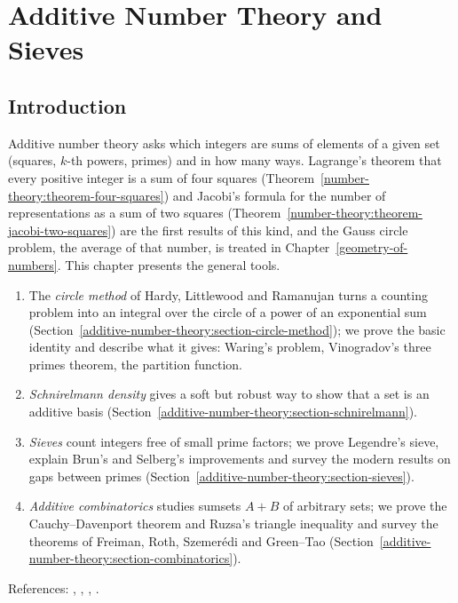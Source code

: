 \chapter{Additive Number Theory and Sieves}\label{additive-number-theory}

\section{Introduction}\label{additive-number-theory:section-introduction}

Additive number theory asks which integers are sums of elements of a given set (squares, $k$-th powers, primes) and in how many ways. Lagrange's theorem that every positive integer is a sum of
four squares (Theorem~\ref{number-theory:theorem-four-squares}) and Jacobi's formula for the number of representations as a sum of two squares (Theorem~\ref{number-theory:theorem-jacobi-two-squares}) are the
first results of this kind, and the Gauss circle problem, the average of that number, is treated in Chapter~\ref{geometry-of-numbers}. This chapter presents the general tools.
\begin{enumerate}
\item The \emph{circle method} of Hardy, Littlewood and Ramanujan turns a counting problem into an integral over the circle of a power of an exponential sum
(Section~\ref{additive-number-theory:section-circle-method}); we prove the basic identity and describe what it gives: Waring's problem, Vinogradov's three primes theorem, the partition function.
\item \emph{Schnirelmann density} gives a soft but robust way to show that a set is an additive basis (Section~\ref{additive-number-theory:section-schnirelmann}).
\item \emph{Sieves} count integers free of small prime factors; we prove Legendre's sieve, explain Brun's and Selberg's improvements and survey the modern results on gaps between primes
(Section~\ref{additive-number-theory:section-sieves}).
\item \emph{Additive combinatorics} studies sumsets $A + B$ of arbitrary sets; we prove the Cauchy--Davenport theorem and Ruzsa's triangle inequality and survey the theorems of Freiman, Roth,
Szemer\'edi and Green--Tao (Section~\ref{additive-number-theory:section-combinatorics}).
\end{enumerate}
References: \cite{vaughan-hardy-littlewood}, \cite{iwaniec-kowalski}, \cite{tao-vu-additive}, \cite{hardy-wright}.

